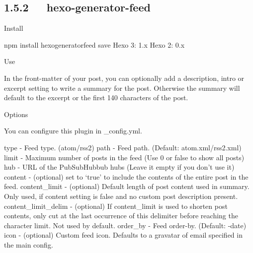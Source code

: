 \documentclass[letterpaper,12pt,english]{sphinxmanual}
\begin{document}
\subsection{1.5.2   hexo-generator-feed}
\label{\detokenize{001software/001install/001._u7f51_u7ad9/hexo:hexo-generator-feed}}

Install

\begin{sphinxVerbatim}[commandchars=\\\{\}]
\PYGZdl{} npm install hexo\PYGZhy{}generator\PYGZhy{}feed \PYGZhy{}\PYGZhy{}save
Hexo 3: 1.x
Hexo 2: 0.x
\end{sphinxVerbatim}

Use

In the front-matter of your post, you can optionally add a description, intro or excerpt setting to write a summary for the post. Otherwise the summary will default to the excerpt or the first 140 characters of the post.

Options

You can configure this plugin in \_config.yml.

\begin{sphinxVerbatim}[commandchars=\\\{\}]
   
   
   
   
   
   
   
\end{sphinxVerbatim}

type - Feed type. (atom/rss2)
path - Feed path. (Default: atom.xml/rss2.xml)
limit - Maximum number of posts in the feed (Use 0 or false to show all posts)
hub - URL of the PubSubHubbub hubs (Leave it empty if you don’t use it)
content - (optional) set to ‘true’ to include the contents of the entire post in the feed.
content\_limit - (optional) Default length of post content used in summary. Only used, if content setting is false and no custom post description present.
content\_limit\_delim - (optional) If content\_limit is used to shorten post contents, only cut at the last occurrence of this delimiter before reaching the character limit. Not used by default.
order\_by - Feed order-by. (Default: -date)
icon - (optional) Custom feed icon. Defaults to a gravatar of email specified in the main config.
\end{document}
